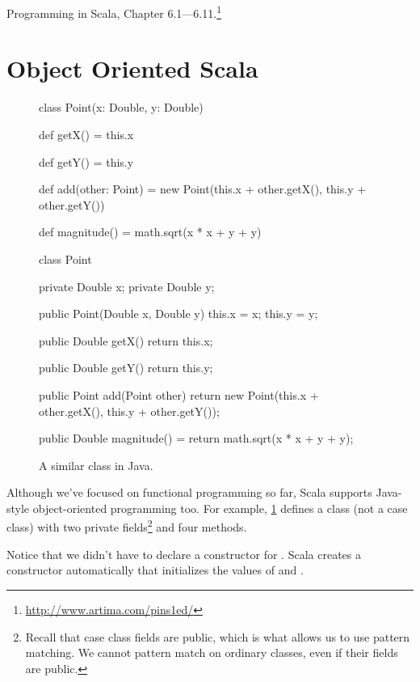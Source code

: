 \documentclass[9pt]{extbook}
\begin{document}
Programming in Scala, Chapter 6.1---6.11.\footnote{\url{http://www.artima.com/pins1ed/}}

\section{Object Oriented Scala}

\begin{figure}
\begin{minipage}{0.45\textwidth}
\begin{scalacode}
class Point(x: Double, y: Double) {

  def getX() = this.x

  def getY() = this.y

  def add(other: Point) = {
    new Point(this.x + other.getX(),
              this.y + other.getY())
  }

  def magnitude() = math.sqrt(x * x + y + y)
}
\end{scalacode}
\caption{A class for points.}\label{pointclass}
\end{minipage}
\quad\vrule\quad
\begin{minipage}{0.45\textwidth}
\begin{javacode}
class Point {
  private Double x;
  private Double y;

  public Point(Double x, Double y) {
    this.x = x;
    this.y = y;
  }

  public Double getX() {
    return this.x;
  }

  public Double getY() {
    return this.y;
  }

  public Point add(Point other) {
    return new Point(this.x + other.getX(),
                     this.y + other.getY());
  }

  public Double magnitude() = {
    return math.sqrt(x * x + y + y);
  }
}
\end{javacode}
\caption{A similar class in Java.}
\end{minipage}
\end{figure}

Although we've focused on functional programming so far, Scala supports
Java-style object-oriented programming too. For example, \cref{pointclass}
defines a  class (not a case class) with two private
fields\footnote{Recall that case class fields are public, which
is what allows us to use pattern matching. We cannot pattern match on ordinary classes,
even if their fields are public.} and four methods.

Notice that we didn't have to declare a constructor for .
Scala creates a constructor automatically that initializes the values of
 and .
\end{document}
